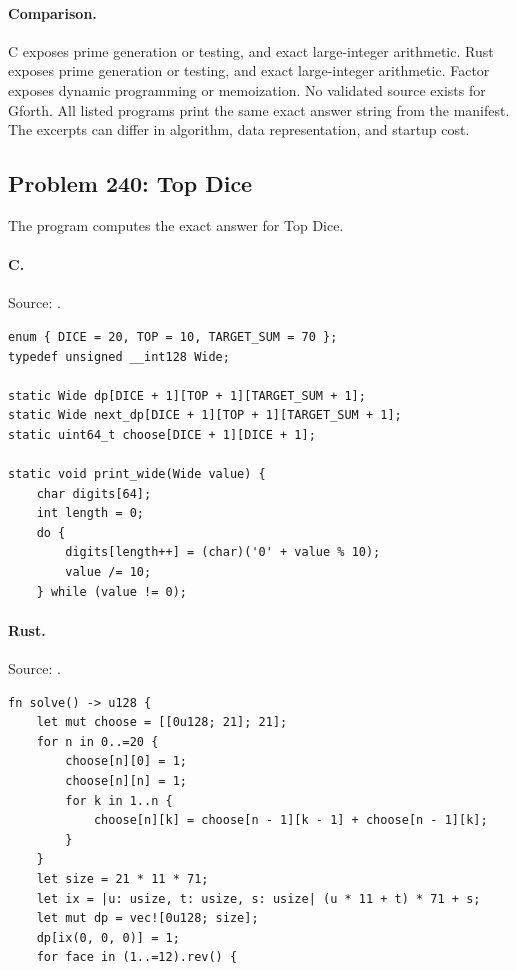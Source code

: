 \paragraph{Comparison.}
C exposes prime generation or testing, and exact large-integer arithmetic. Rust exposes prime generation or testing, and exact large-integer arithmetic. Factor exposes dynamic programming or memoization.
No validated source exists for Gforth.
All listed programs print the same exact answer string from the manifest. The excerpts can differ in algorithm, data representation, and startup cost.

\subsection{Problem 240: Top Dice}
\label{walkthrough:p240}
The program computes the exact answer for Top Dice.

\paragraph{C.} Source: .
\begin{lstlisting}
enum { DICE = 20, TOP = 10, TARGET_SUM = 70 };
typedef unsigned __int128 Wide;

static Wide dp[DICE + 1][TOP + 1][TARGET_SUM + 1];
static Wide next_dp[DICE + 1][TOP + 1][TARGET_SUM + 1];
static uint64_t choose[DICE + 1][DICE + 1];

static void print_wide(Wide value) {
    char digits[64];
    int length = 0;
    do {
        digits[length++] = (char)('0' + value % 10);
        value /= 10;
    } while (value != 0);
\end{lstlisting}

\paragraph{Rust.} Source: .
\begin{lstlisting}
fn solve() -> u128 {
    let mut choose = [[0u128; 21]; 21];
    for n in 0..=20 {
        choose[n][0] = 1;
        choose[n][n] = 1;
        for k in 1..n {
            choose[n][k] = choose[n - 1][k - 1] + choose[n - 1][k];
        }
    }
    let size = 21 * 11 * 71;
    let ix = |u: usize, t: usize, s: usize| (u * 11 + t) * 71 + s;
    let mut dp = vec![0u128; size];
    dp[ix(0, 0, 0)] = 1;
    for face in (1..=12).rev() {
\end{lstlisting}

